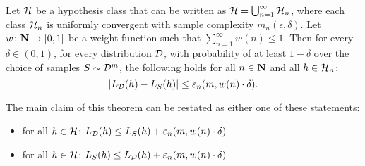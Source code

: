 \begin{theorem}
\label{thm:SRM1}
Let $\mathcal{H}$ be a hypothesis class that can be written as $\mathcal{H} =
\bigcup_{n = 1}^{\infty} \mathcal{H}_n$, where each class $\mathcal{H}_n$ is
uniformly convergent with sample complexity $m_n(\epsilon, \delta)$. Let $w
\colon \mathbf{N} \rightarrow [0, 1]$ be a weight function such that  $\sum_{n =
1}^{\infty} w(n) \leq 1$. Then for every $\delta \in (0, 1)$, for every
distribution $\mathcal{D}$, with probability of at least $1 - \delta$ over the choice
of samples $S \sim \mathcal{D}^m$, the following holds for all $n \in \mathbf{N}$ and all
$h \in \mathcal{H}_n$:
\[
    |L_{\mathcal{D}} (h) - L_S (h)| \leq \varepsilon_n (m, w(n) \cdot \delta).
\]
\end{theorem}
The main claim of this theorem can be restated as either
one of these statements:
\begin{itemize}
    \item for all $h \in \mathcal{H}$:
        $L_{\mathcal{D}} (h) \leq L_S(h) + \varepsilon_n (m, w(n) \cdot \delta)$
    \item for all $h \in \mathcal{H}$:
    $L_{S} (h) \leq L_{\mathcal{D}}(h) + \varepsilon_n (m, w(n) \cdot \delta)$
\end{itemize}

